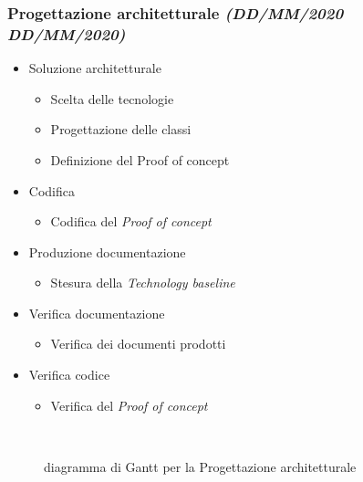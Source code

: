 \documentclass[../piano-di-progetto.tex]{subfiles}
\begin{document}
\subsubsection[Progettazione architetturale]{Progettazione architetturale {\normalsize\normalfont\itshape(DD/MM/2020  DD/MM/2020)}}%
\label{subs:progettazione_architetturale}
\begin{itemize}
  \item Soluzione architetturale
  \begin{itemize}
    \item Scelta delle tecnologie
    \item Progettazione delle classi
    \item Definizione del \textit{}{Proof of concept}
  \end{itemize}
  \item Codifica
  \begin{itemize}
    \item Codifica del \textit{Proof of concept}
  \end{itemize}
  \item Produzione documentazione
  \begin{itemize}
    \item Stesura della \textit{Technology baseline}
  \end{itemize}
  \item Verifica documentazione
  \begin{itemize}
    \item Verifica dei documenti prodotti
  \end{itemize}
  \item Verifica  codice 
  \begin{itemize}
    \item Verifica  del \textit{Proof of concept}
  \end{itemize}
\end{itemize}
\begin{figure}[H]
  \centering
  
  \caption{diagramma di Gantt per la Progettazione architetturale}%
~~\label{fig:gantt_progettazione_architetturale}
\end{figure}
\end{document}
